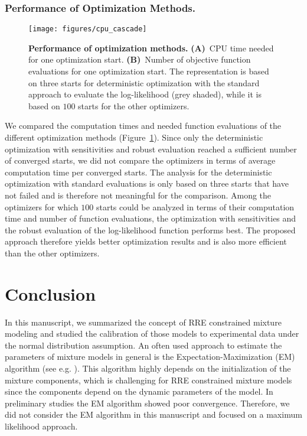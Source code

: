 \documentclass{llncs}
\begin{document}
\subsubsection{Performance of Optimization Methods.}
\begin{figure}[tb]
\centering
\texttt{[image: figures/cpu\_cascade]}
\caption{\color{revcol}\textbf{Performance of optimization methods.} \textbf{(A)}~CPU time needed for one optimization start. \textbf{(B)}~Number of objective function evaluations for one optimization start. The representation is based on three starts for deterministic optimization with the standard approach to evaluate the log-likelihood (grey shaded), while it is based on $100$ starts for the other optimizers.}\label{fig:cpu_cascade}
\end{figure}
We compared the computation times and needed function evaluations of the different optimization methods (Figure~\ref{fig:cpu_cascade}). Since only the deterministic optimization with sensitivities and robust evaluation reached a sufficient number of converged starts, we did not compare the optimizers in terms of average computation time per converged starts. The analysis for the deterministic optimization with standard evaluations is only based on three starts that have not failed and is therefore not meaningful for the comparison. Among the optimizers for which $100$ starts could be analyzed in terms of their computation time and number of function evaluations, the optimization with sensitivities and the robust evaluation of the log-likelihood function performs best. The proposed approach therefore yields better optimization results and is also more efficient than the other optimizers.\color{black}

\section{Conclusion}\label{sec:discussion} 
In this manuscript, we summarized the concept of RRE constrained mixture modeling and studied the calibration of those models to  experimental data under the normal distribution assumption. \color{revcol}An often used approach to estimate the parameters of mixture models in general is the Expectation-Maximization (EM) algorithm (see e.g. \cite{Bishop2006}). This algorithm highly depends on the initialization of the mixture components, which is challenging for RRE constrained mixture models since the components depend on the dynamic parameters of the model. In preliminary studies the EM algorithm showed poor convergence. Therefore, we did not consider the EM algorithm in this manuscript and focused on a maximum likelihood approach.  \color{black}
\end{document}
